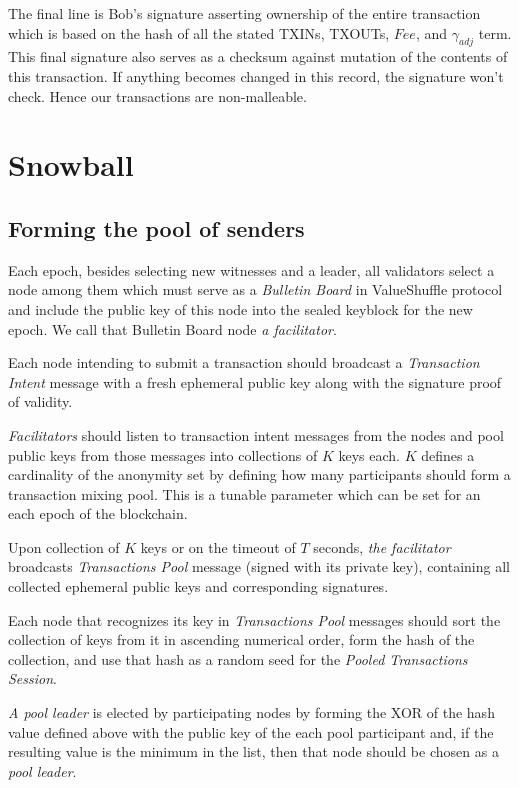 \documentclass[8pt,fleqn,openany]{book}
\begin{document}
{The final line is Bob’s signature asserting ownership of the entire transaction which is based on the hash of all the stated TXINs, TXOUTs, $Fee$, and $\gamma_{adj}$ term. This final signature also serves as a checksum against mutation of the contents of this transaction. If anything becomes changed in this record, the signature won’t check. Hence our transactions are non-malleable.

\chapter{Snowball}\label{app:snowball}

\section{Forming the pool of senders}
Each epoch, besides selecting new witnesses and a leader, all validators select a node among them which must serve as a \textit{Bulletin Board} in ValueShuffle protocol and include the public key of this node into the sealed keyblock for the new epoch. We call that Bulletin Board node \textit{a facilitator}.

Each node intending to submit a transaction should broadcast a \textit{Transaction Intent} message with a fresh ephemeral public key along with the signature proof of validity.

\textit{Facilitators} should listen to transaction intent messages from the nodes and pool public keys from those messages into collections of $K$ keys each. $K$ defines a cardinality of the anonymity set by defining how many participants should form a transaction mixing pool. This is a tunable parameter which can be set for an each epoch of the blockchain. 

Upon collection of $K$ keys or on the timeout of $T$ seconds, \textit{the facilitator} broadcasts \textit{Transactions Pool} message (signed with its private key), containing all collected ephemeral public keys and corresponding signatures.

Each node that recognizes its key in \textit{Transactions Pool} messages should sort the collection of keys from it in ascending numerical order, form the hash of the collection, and use that hash as a random seed for the \textit{Pooled Transactions Session}.

\textit{A pool leader} is elected by participating nodes by forming the XOR of the hash value defined above with the public key of the each pool participant and, if the resulting value is the minimum in the list, then that node should be chosen as a \textit{pool leader}.

}
\end{document}

